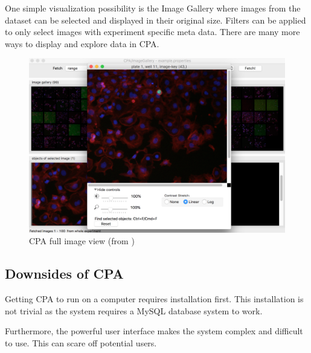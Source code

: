 One simple visualization possibility is the Image Gallery where images from the dataset can be selected and 
displayed in their original size. Filters can be applied to only select images with experiment specific meta data. 
There are many more ways to display and explore data in CPA.

\begin{figure}[H]
	\centering
	\includegraphics[width=1.0\linewidth]{bilder/related_work/visualization.png}
	\caption{CPA full image view (from \cite{Jones2008})}
	\label{fig:RL}
\end{figure}


\subsection{Downsides of CPA}
Getting CPA to run on a computer requires installation first. This installation is
not trivial as the system requires a MySQL database system to work.

Furthermore, the powerful user interface makes the system complex and difficult to use. This can 
scare off potential users.





